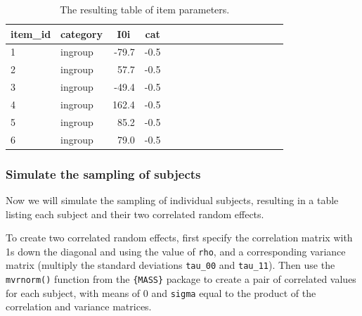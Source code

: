 \documentclass[doc,floatsintext]{apa6}
\begin{document}
\begin{table}[H]
\begin{center}
\begin{threeparttable}
\caption{\label{tab:items-table}The resulting table of item parameters.}
\begin{tabular}{llrrllrrllrrllrr}
\toprule
item\_id & \multicolumn{1}{c}{category} & \multicolumn{1}{c}{I0i} & \multicolumn{1}{c}{cat}\\
\midrule
1 & ingroup & -79.7 & -0.5\\
2 & ingroup & 57.7 & -0.5\\
3 & ingroup & -49.4 & -0.5\\
4 & ingroup & 162.4 & -0.5\\
5 & ingroup & 85.2 & -0.5\\
6 & ingroup & 79.0 & -0.5\\
\bottomrule
\end{tabular}
\end{threeparttable}
\end{center}
\end{table}

\subsubsection{Simulate the sampling of
subjects}\label{simulate-the-sampling-of-subjects}

Now we will simulate the sampling of individual subjects, resulting in a
table listing each subject and their two correlated random effects.

To create two correlated random effects, first specify the correlation
matrix with 1s down the diagonal and using the value of \texttt{rho},
and a corresponding variance matrix (multiply the standard deviations
\texttt{tau\_00} and \texttt{tau\_11}). Then use the \texttt{mvrnorm()}
function from the \texttt{\{MASS\}} package to create a pair of
correlated values for each subject, with means of 0 and \texttt{sigma}
equal to the product of the correlation and variance matrices.
\end{document}
